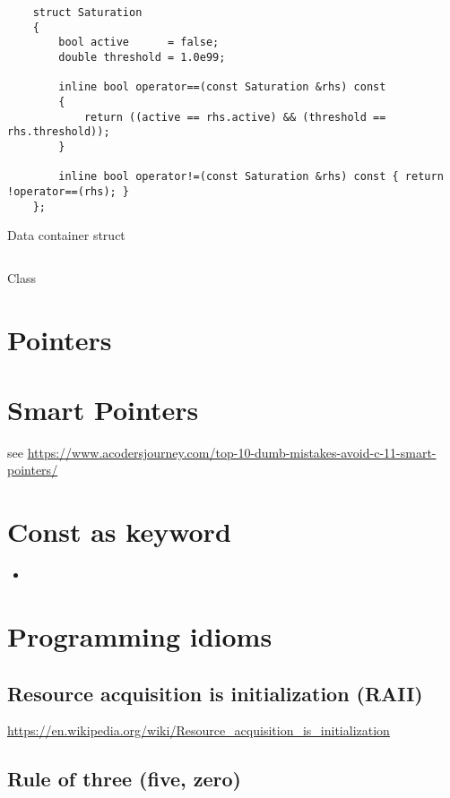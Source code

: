 \documentclass[
10pt,
a4paper,
parskip=half,	%
DIV=0,			%
BCOR=10mm
]{scrartcl}
\begin{document}
\begin{listing}[htbp]
	\begin{verbatim}
	struct Saturation
	{
		bool active      = false;
		double threshold = 1.0e99;
		
		inline bool operator==(const Saturation &rhs) const
		{
			return ((active == rhs.active) && (threshold == rhs.threshold));
		}
		
		inline bool operator!=(const Saturation &rhs) const { return !operator==(rhs); }
	};
	\end{verbatim}
	\caption{Data container struct}
\end{listing}

\begin{listing}[htbp]
	\inputminted{cpp}{src/classes-structs/ReceiverPath.h}
	\caption{Class}
\end{listing}
	
\pagebreak
\section{Pointers}

	
\section{Smart Pointers}
    see \url{https://www.acodersjourney.com/top-10-dumb-mistakes-avoid-c-11-smart-pointers/}
    
\section{Const as keyword}
\begin{itemize}
	\item 
\end{itemize}
\section{Programming idioms} 
\label{sec:programming-idioms}
	\subsection{Resource acquisition is initialization (RAII)}
	
	\url{https://en.wikipedia.org/wiki/Resource_acquisition_is_initialization}
	
	\subsection{Rule of three (five, zero)}
	\label{subsec:rule-of-three}
	
\end{document}
